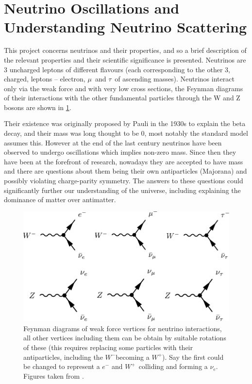 \documentclass[a4paper,12pt]{article}
\newcommand{\Mu}{$\mu$}
\newcommand{\Tau}{$\tau$}
\newcommand{\Ne}{$\nu_e$}
\newcommand{\Wp}{$W^+$}
\newcommand{\Wm}{$W^-$}
\begin{document}
\pagestyle{plain}
\setcounter{page}{1}

\section{Neutrino Oscillations and Understanding Neutrino Scattering}
This project concerns neutrinos and their properties, and so a brief description of the relevant properties and their scientific significance is presented.
Neutrinos are 3 uncharged leptons of different flavours (each corresponding to the other 3, charged, leptons -- electron, \Mu\ and \Tau\ of ascending masses).
Neutrinos interact only via the weak force and with very low cross sections, the Feynman diagrams of their interactions with the other fundamental particles through the W and Z bosons are shown in \cref{fig:nu_feyn}.

Their existence was originally proposed by Pauli in the 1930s to explain the beta decay, and their mass was long thought to be 0, most notably the standard model assumes this.
However at the end of the last century neutrinos have been observed to undergo oscillations which implies non-zero mass.
Since then they have been at the forefront of research, nowadays they are accepted to have mass and there are questions about them being their own antiparticles (Majorana) and possibly violating charge-parity symmetry.
The answers to these questions could significantly further our understanding of the universe, including explaining the dominance of matter over antimatter.

\begin{figure}[H]
    \centering
    \includegraphics{figures/NeutrinoFeynman.pdf}
    \caption{
        Feynman diagrams of weak force vertices for neutrino interactions, all other vertices including them can be obtain by suitable rotations of these
        (this requires replacing some particles with their antiparticles, including the \Wm becoming a \Wp).
        Say the first could be changed to represent a $e^-$ and \Wp\ colliding and forming a \Ne.
        Figures taken from \cite{potterFeynmanDiagramsParticlea}.
    }\label{fig:nu_feyn}
\end{figure}
\end{document}
